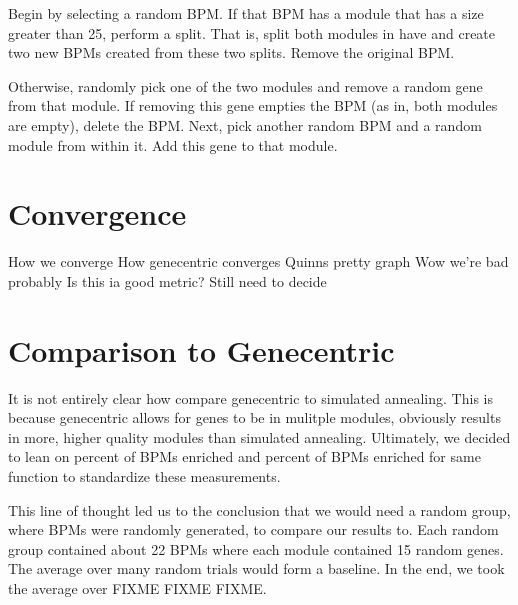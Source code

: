 \documentclass[11pt]{article}
\begin{document}
\par Begin by selecting a random BPM. If that BPM has a module that has a size greater than 25, perform a split. That is, split both modules in have and create two new BPMs created from these two splits. Remove the original BPM.

\par Otherwise, randomly pick one of the two modules and remove a random gene from that module. If removing this gene empties the BPM (as in, both modules are empty), delete the BPM. Next, pick another random BPM and a random module from within it. Add this gene to that module. 

\section{Convergence}
How we converge
How genecentric converges
Quinns pretty graph
Wow we're bad probably
Is this ia good metric? Still need to decide



\section{Comparison to Genecentric}

\par It is not entirely clear how compare genecentric to simulated annealing. This is because genecentric allows for genes to be in mulitple modules, obviously results in more, higher quality modules than simulated annealing. Ultimately, we decided to lean on percent of BPMs enriched and percent of BPMs enriched for same function to standardize these measurements. 

\par This line of thought led us to the conclusion that we would need a random group, where BPMs were randomly generated, to compare our results to. Each random group contained about 22 BPMs where each module contained 15 random genes. The average over many random trials would form a baseline. In the end, we took the average over FIXME FIXME FIXME.
\end{document}
